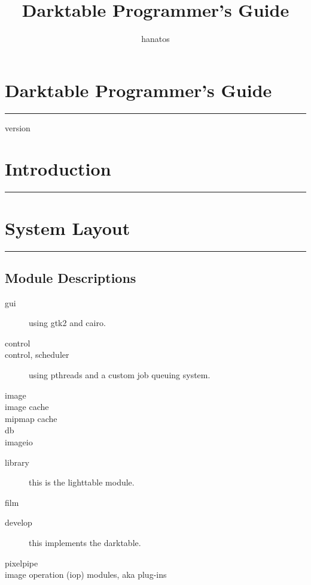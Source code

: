 \documentclass[a4paper,twoside]{scrartcl}
\title{Darktable Programmer's Guide}
\author{hanatos}
\newcommand{\nicesection}[2]{%
\cleardoublepage
\fbox{\texttt{[image: \#1]}}%
\vspace*{-1em}%
\section{\hfill #2}
\hrule
\vspace*{\baselineskip}%
}
\begin{document}
%
\vspace*{-1em}%
\section*{\hfill Darktable Programmer's Guide}
\hrule

\vspace*{4\baselineskip}

{\hfill version  }

\thispagestyle{empty}

\newpage
\tableofcontents


\nicesection{header1}{Introduction}
\label{sec:introduction}


\nicesection{header2}{System Layout}

\resizebox{\linewidth}{!}{}

\subsection{Module Descriptions}

\begin{description}
  \item[gui] using gtk2 and cairo.
\end{description}
\begin{description}
  \item[control]
  \item[control, scheduler] using pthreads and a custom job queuing system.
\end{description}
\begin{description}
  \item[image]
  \item[image cache]
  \item[mipmap cache]
  \item[db]
  \item[imageio]
\end{description}
\begin{description}
  \item[library] this is the lighttable module.
  \item[film]
\end{description}
\begin{description}
  \item[develop] this implements the darktable.
  \item[pixelpipe]
  \item[image operation (iop) modules, aka plug-ins]
\end{description}
\end{document}
